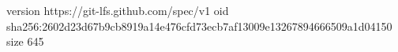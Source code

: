 version https://git-lfs.github.com/spec/v1
oid sha256:2602d23d67b9cb8919a14e476cfd73ecb7af13009e13267894666509a1d04150
size 645
